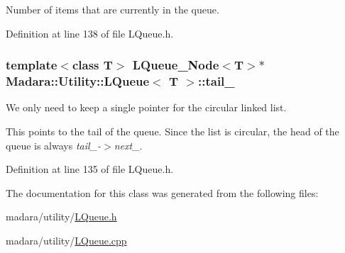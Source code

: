 Number of items that are currently in the queue. 



Definition at line 138 of file LQueue.h.

\hypertarget{classMadara_1_1Utility_1_1LQueue_af5c1db41541efbedd186a17cc2714b66}{
\subsubsection[{tail\_\-}]{\setlength{\rightskip}{0pt plus 5cm}template$<$class T$>$ {\bf LQueue\_\-Node}$<$T$>$$\ast$ {\bf Madara::Utility::LQueue}$<$ T $>$::{\bf tail\_\-}}}
\label{d7/df8/classMadara_1_1Utility_1_1LQueue_af5c1db41541efbedd186a17cc2714b66}


We only need to keep a single pointer for the circular linked list. 

This points to the tail of the queue. Since the list is circular, the head of the queue is always {\itshape tail\_\--\/$>$next\_\-\/}. 

Definition at line 135 of file LQueue.h.



The documentation for this class was generated from the following files:\begin{DoxyCompactItemize}
\item 
madara/utility/\hyperlink{LQueue_8h}{LQueue.h}\item 
madara/utility/\hyperlink{LQueue_8cpp}{LQueue.cpp}\end{DoxyCompactItemize}
